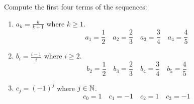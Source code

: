\guard




\begin{exmp}
\label{exmp:computeTermsOfSequence}
  Compute the first four terms of the sequences:
  \begin{enumerate}
    \item $a_k = \frac{k}{k+1}$ where $k\geq 1$.\\
      \[  a_1=\frac{1}{2}\quad
          a_2=\frac{2}{3}\quad
          a_3=\frac{3}{4}\quad
          a_4=\frac{4}{5} \]
    \item $b_i = \frac{i-1}{i}$ where $i\geq 2$.\\
      \[  b_2=\frac{1}{2}\quad
          b_3=\frac{2}{3}\quad
          b_4=\frac{3}{4}\quad
          b_5=\frac{4}{5} \]
    \item $c_j = (-1)^j$ where $j\in\mathbb{N}$.
      \[  c_0=1\quad
          c_1=-1\quad
          c_2=1\quad
          c_3=-1 \]
  \end{enumerate}
\end{exmp}
